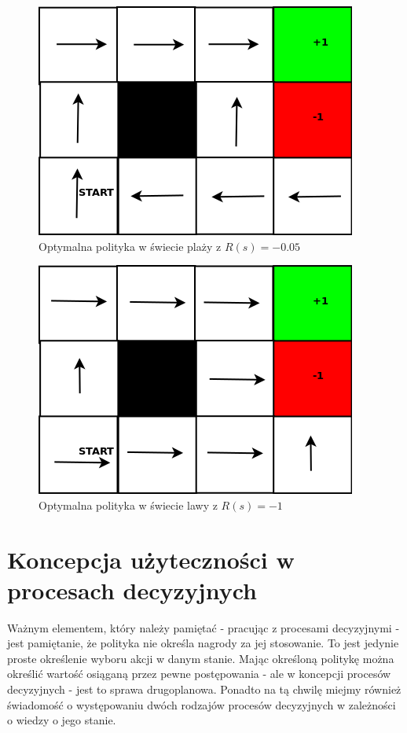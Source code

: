 \documentclass[10pt,a4paper]{book}
\begin{document}
\begin{figure}
\centering
\includegraphics[scale=0.3]{grids/sand_solution.png}
\caption{Optymalna polityka w świecie plaży z $R(s) = -0.05$} \label{fig-warm-sand}
\end{figure}

\begin{figure}
\centering
\includegraphics[scale=0.3]{grids/lava_world.png}
\caption{Optymalna polityka w świecie lawy z $R(s) = -1$} \label{fig-lava}
\end{figure}

\section{Koncepcja użyteczności w procesach decyzyjnych}

Ważnym elementem, który należy pamiętać - pracując z procesami decyzyjnymi - jest pamiętanie, że polityka nie określa nagrody za jej stosowanie.  To jest jedynie proste określenie wyboru akcji w danym stanie. Mając określoną politykę można określić wartość osiąganą przez pewne postępowania - ale w koncepcji procesów decyzyjnych - jest to sprawa drugoplanowa. Ponadto na tą chwilę miejmy również świadomość o występowaniu dwóch rodzajów procesów decyzyjnych w zależności o wiedzy o jego stanie.
\end{document}
